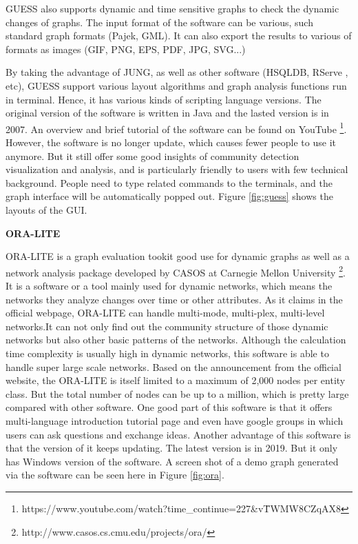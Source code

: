GUESS also supports dynamic and time sensitive graphs to check the dynamic changes of graphs. The input format of the software can be various, such standard graph formats (Pajek, GML). It can also export the results to various of formats  as images (GIF, PNG, EPS, PDF, JPG, SVG...)

By taking the advantage of JUNG, as well as other software (HSQLDB, RServe , etc), GUESS support various layout algorithms and graph analysis functions run in terminal. Hence, it has various kinds of scripting language versions. The original version of the software is written in Java and the lasted version is in 2007. An overview and brief tutorial of the software can be found on YouTube \footnote{https://www.youtube.com/watch?time\_continue=227\&v\=TWMW8CZqAX8}. However, the software is no longer update, which causes fewer people to use it anymore. But it still offer some good insights of community detection visualization and analysis, and is particularly friendly to users with few technical background. People need to type related commands to the terminals, and the graph interface will be automatically popped out. Figure \ref{fig:guess} shows the layouts of the GUI.

\textbf{ORA-LITE}

ORA-LITE \cite{carley2014ora} is a graph evaluation tookit good use for dynamic graphs as well as a network analysis package developed by CASOS at Carnegie Mellon University \footnote{http://www.casos.cs.cmu.edu/projects/ora/}. It is a software or a tool mainly used for dynamic networks, which means the networks they analyze changes over time or other attributes. As it claims in the official webpage, ORA-LITE can handle multi-mode, multi-plex, multi-level networks.It can not only find out the community structure of those dynamic networks but also other basic patterns of the networks. Although  the calculation time complexity is usually high in dynamic networks, this software is able to handle super large scale networks. Based on the announcement from the official website, the ORA-LITE is itself limited to a maximum of 2,000 nodes per entity class. But the total number of nodes can be up to a million, which is pretty large compared with other software. One good part of this software is that it offers multi-language introduction tutorial page and even have  google groups in which users can ask questions and exchange ideas. Another advantage of this software is that the version of it keeps updating. The latest version is in 2019. But it only has Windows version of the software. A screen shot of a demo graph generated via the software can be seen here in Figure \ref{fig:ora}. 

